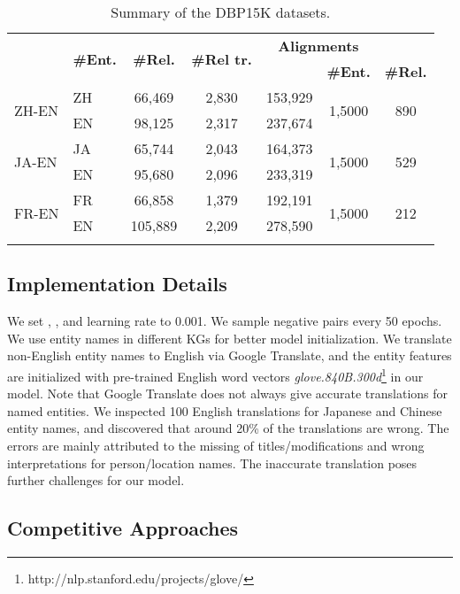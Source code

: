 \documentclass[11pt,a4paper]{article}
\begin{document}
\begin{table}[t!]
	\centering
	\scriptsize
	\begin{tabular}{l|l|ccc|cc}
		\Xhline{1pt}
		\multicolumn{2}{c|}{\multirow{2}{*}{\bf DBP15K}} & \multirow{2}{*}{\textbf{\#Ent.}} & \multirow{2}{*}{\textbf{\#Rel.}} & \multirow{2}{*}{\textbf{\#Rel tr.}} & \multicolumn{2}{c}{\textbf{Alignments}}\\
		\multicolumn{1}{c}{} & \multicolumn{1}{c|}{} & & & & \textbf{\#Ent.} & \textbf{\#Rel.} \\
		\hline
		\multirow{2}{*}{ZH-EN} & ZH & 66,469 & 2,830 & 153,929 & \multirow{2}{*}{1,5000} & \multirow{2}{*}{890}\\
		& EN & 98,125 & 2,317 & 237,674 \\
		\hline
		\multirow{2}{*}{JA-EN} & JA & 65,744 & 2,043 & 164,373 & \multirow{2}{*}{1,5000} & \multirow{2}{*}{529} \\
		& EN & 95,680 & 2,096 & 233,319\\
		\hline
		\multirow{2}{*}{FR-EN} & FR & 66,858 & 1,379 & 192,191 & \multirow{2}{*}{1,5000} & \multirow{2}{*}{212} \\
		& EN & 105,889 & 2,209 & 278,590\\
		\Xhline{1pt}
	\end{tabular}
	\caption{Summary of the DBP15K datasets.}
	\label{dataset}
\end{table}


\subsection{Implementation Details}
\label{implementation} We set , , and learning rate to 0.001. We sample  negative pairs every 50
epochs.
We use entity names in different KGs for better model initialization. We translate non-English entity names to English via Google Translate, and the entity features are initialized with pre-trained English word vectors
\emph{glove.840B.300d}\footnote{http://nlp.stanford.edu/projects/glove/} in our model.
Note that Google Translate does not always give accurate translations for named entities. We inspected 100 English translations for Japanese and
Chinese entity names, and discovered that around 20\% of the translations are wrong. The errors are mainly attributed to the missing of
titles/modifications and wrong interpretations for person/location names. The inaccurate translation poses further challenges for our model.


\subsection{Competitive Approaches}
\end{document}
